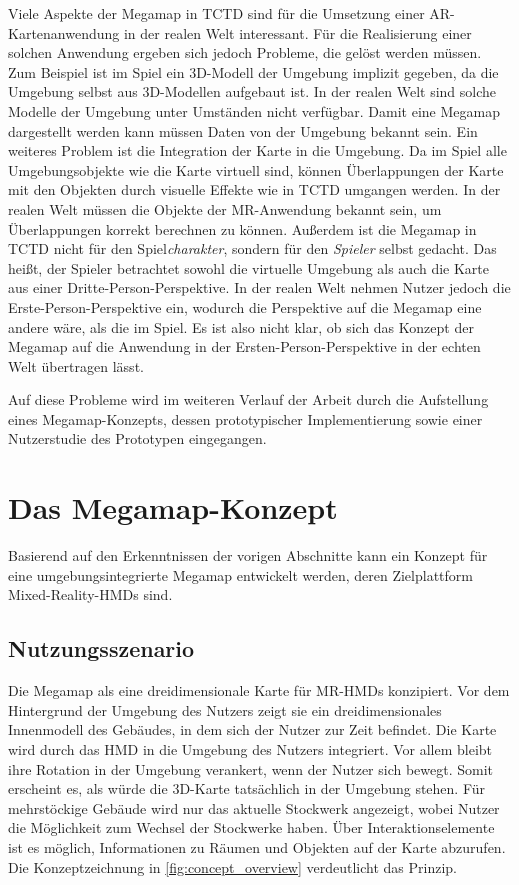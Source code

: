 Viele Aspekte der Megamap in TCTD sind für die Umsetzung einer AR-Kartenanwendung in der realen Welt interessant.
Für die Realisierung einer solchen Anwendung ergeben sich jedoch Probleme, die gelöst werden müssen.
Zum Beispiel ist im Spiel ein 3D-Modell der Umgebung implizit gegeben, da die Umgebung selbst aus 3D-Modellen aufgebaut ist.
In der realen Welt sind solche Modelle der Umgebung unter Umständen nicht verfügbar.
Damit eine Megamap dargestellt werden kann müssen Daten von der Umgebung bekannt sein.
Ein weiteres Problem ist die Integration der Karte in die Umgebung.
Da im Spiel alle Umgebungsobjekte wie die Karte virtuell sind, können Überlappungen der Karte mit den Objekten durch visuelle Effekte wie in TCTD umgangen werden.
In der realen Welt müssen die Objekte der MR-Anwendung bekannt sein, um Überlappungen korrekt berechnen zu können.
Außerdem ist die Megamap in TCTD nicht für den Spiel\emph{charakter}, sondern für den \emph{Spieler} selbst gedacht.
Das heißt, der Spieler betrachtet sowohl die virtuelle Umgebung als auch die Karte aus einer Dritte-Person-Perspektive.
In der realen Welt nehmen Nutzer jedoch die Erste-Person-Perspektive ein, wodurch die Perspektive auf die Megamap eine andere wäre, als die im Spiel.
Es ist also nicht klar, ob sich das Konzept der Megamap auf die Anwendung in der Ersten-Person-Perspektive in der echten Welt übertragen lässt.

Auf diese Probleme wird im weiteren Verlauf der Arbeit durch die Aufstellung eines Megamap-Konzepts, dessen prototypischer Implementierung sowie einer Nutzerstudie des Prototypen eingegangen.

\section{Das Megamap-Konzept}
Basierend auf den Erkenntnissen der vorigen Abschnitte kann ein Konzept für eine umgebungsintegrierte Megamap entwickelt werden, deren Zielplattform Mixed-Reality-HMDs sind.

\subsection{Nutzungsszenario}
Die Megamap als eine dreidimensionale Karte für MR-HMDs konzipiert.
Vor dem Hintergrund der Umgebung des Nutzers zeigt sie ein dreidimensionales Innenmodell des Gebäudes, in dem sich der Nutzer zur Zeit befindet.
Die Karte wird durch das HMD in die Umgebung des Nutzers integriert.
Vor allem bleibt ihre Rotation in der Umgebung verankert, wenn der Nutzer sich bewegt.
Somit erscheint es, als würde die 3D-Karte tatsächlich in der Umgebung stehen.
Für mehrstöckige Gebäude wird nur das aktuelle Stockwerk angezeigt, wobei Nutzer die Möglichkeit zum Wechsel der Stockwerke haben.
Über Interaktionselemente ist es möglich, Informationen zu Räumen und Objekten auf der Karte abzurufen.
Die Konzeptzeichnung in \autoref{fig:concept_overview} verdeutlicht das Prinzip.

